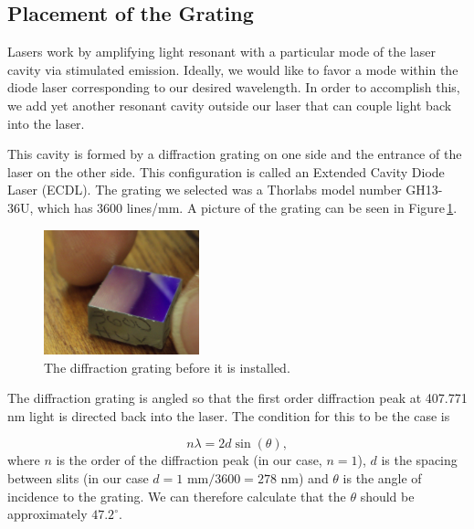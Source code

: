 \subsection{Placement of the Grating}



Lasers work by amplifying light resonant with a particular mode of the laser cavity via stimulated emission. Ideally, we would like to favor a mode within the diode laser corresponding to our desired wavelength. In order to accomplish this, we add yet another resonant cavity outside our laser that can couple light back into the laser. 

This cavity is formed by a diffraction grating on one side and the entrance of the laser on the other side. This configuration is called an Extended Cavity Diode Laser (ECDL). The grating we selected was a Thorlabs model number GH13-36U, which has 3600 lines/mm. A picture of the grating can be seen in Figure\,\ref{diffractionGratingPhoto}. 

\begin{figure}
\centerline{
\includegraphics[width=0.4\textwidth]{diffractionGrating.JPG}
}
\caption[Photograph of Diffraction Grating]{\label{diffractionGratingPhoto} The diffraction grating before it is installed.}
\end{figure}

The diffraction grating is angled so that the first order diffraction peak at 407.771 nm light is directed back into the laser. The condition for this to be the case is 

\begin{equation} \label{gratingEQn}
n \lambda = 2 d \sin (\theta),
\end{equation}
where $n$ is the order of the diffraction peak (in our case, $n=1$), $d$ is the spacing between slits (in our case $d=1$ mm$/3600 = 278 $ nm) and $\theta$ is the angle of incidence to the grating. We can therefore calculate that the $\theta$ should be approximately
\href{http://www.wolframalpha.com/input/?i=arcsin%28+407.771+nm+%2F%282*%281+mm%2F3600%29%29%29+in+degrees}{$47.2^\circ$}.

